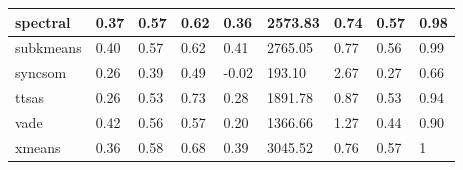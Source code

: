 \begin{table}[H]
\begin{tabular}{|l|l|l|l|l|l|l|l|l|}
\hline
spectral & 0.37 & 0.57 & 0.62 & 0.36 & 2573.83 & 0.74 & 0.57 & 0.98 \\
\hline
subkmeans & 0.40 & 0.57 & 0.62 & 0.41 & 2765.05 & 0.77 & 0.56 & 0.99 \\
\hline
syncsom & 0.26 & 0.39 & 0.49 & -0.02 & 193.10 & 2.67 & 0.27 & 0.66 \\
\hline
ttsas & 0.26 & 0.53 & 0.73 & 0.28 & 1891.78 & 0.87 & 0.53 & 0.94 \\
\hline
vade & 0.42 & 0.56 & 0.57 & 0.20 & 1366.66 & 1.27 & 0.44 & 0.90 \\
\hline
xmeans & 0.36 & 0.58 & 0.68 & 0.39 & 3045.52 & 0.76 & 0.57 & 1 \\
\hline
\end{tabular}
\end{table}